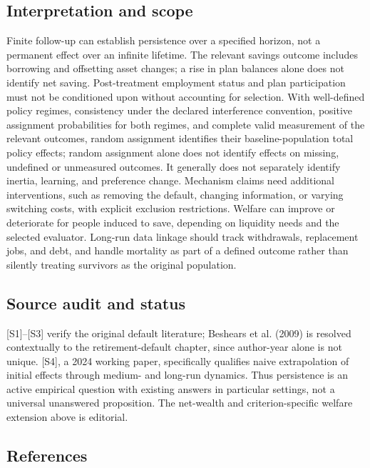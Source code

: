 \documentclass[11pt,a4paper]{article}
\begin{document}
\subsection*{Interpretation and scope}

Finite follow-up can establish persistence over a specified horizon, not a permanent effect over an infinite lifetime. The relevant savings outcome includes borrowing and offsetting asset changes; a rise in plan balances alone does not identify net saving. Post-treatment employment status and plan participation must not be conditioned upon without accounting for selection. With well-defined policy regimes, consistency under the declared interference convention, positive assignment probabilities for both regimes, and complete valid measurement of the relevant outcomes, random assignment identifies their baseline-population total policy effects; random assignment alone does not identify effects on missing, undefined or unmeasured outcomes. It generally does not separately identify inertia, learning, and preference change. Mechanism claims need additional interventions, such as removing the default, changing information, or varying switching costs, with explicit exclusion restrictions. Welfare can improve or deteriorate for people induced to save, depending on liquidity needs and the selected evaluator. Long-run data linkage should track withdrawals, replacement jobs, and debt, and handle mortality as part of a defined outcome rather than silently treating survivors as the original population.

\subsection*{Source audit and status}

[S1]--[S3] verify the original default literature; Beshears et al. (2009) is resolved contextually to the retirement-default chapter, since author-year alone is not unique. [S4], a 2024 working paper, specifically qualifies naive extrapolation of initial effects through medium- and long-run dynamics. Thus persistence is an active empirical question with existing answers in particular settings, not a universal unanswered proposition. The net-wealth and criterion-specific welfare extension above is editorial.

\subsection*{References}
\end{document}
